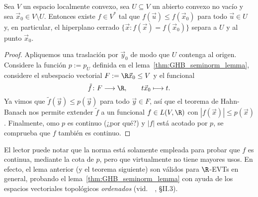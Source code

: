 \documentclass[topologia-analisis.tex]{subfiles}
\begin{document}
\addtocounter{thmi}{1}
\begin{slem}
	Sea $V$ un espacio localmente convexo, sea $U \subseteq V$ un abierto convexo no vacío y sea $\vec x_0 \in V \setminus U$.
	Entonces existe $f \in V^*$ tal que $f(\vec u) \le f(\vec x_0)$ para todo $\vec u \in U$ y,
	en particular, el hiperplano cerrado $\{ \vec x : f(\vec x) = f(\vec x_0) \}$ separa a $U$ y al punto $\vec x_0$.
\end{slem}
\begin{proof}
	Apliquemos una traslación por $\vec y_0$ de modo que $U$ contenga al origen.
	Considere la función $p := p_U$ definida en el lema~\ref{thm:GHB_seminorm_lemma},
	considere el subespacio vectorial $F := \R\vec x_0 \le V$ y el funcional
	\[
		\tilde f \colon F \longrightarrow \R, \qquad t\vec x_0 \longmapsto t.
	\]
	Ya vimos que $\tilde f(\vec y) \le p(\vec y)$ para todo $\vec y \in F$, así que el teorema de Hahn-Banach nos permite extender $\tilde f$
	a un funcional $f \in L(V, \R)$ con $|f(\vec x)| \le p(\vec x)$.
	Finalmente, omo $p$ es continuo (¿por qué?) y $|f|$ está acotado por $p$, se comprueba que $f$ también es continuo.
\end{proof}
El lector puede notar que la norma está solamente empleada para probar que $f$ es continua, mediante la cota de $p$, pero que virtualmente
no tiene mayores usos.
En efecto, el lema anterior (y el teorema siguiente) son válidos para $\R$-EVTs en general, probando el lema~\ref{thm:GHB_seminorm_lemma}
con ayuda de los espacios vectoriales topológicos \emph{ordenados} (vid.\ \citeauthor{bourbaki:evt}~\cite[II.22\psqq]{bourbaki:evt}, \S II.3).
\addtocounter{thmi}{-1}
\end{document}
